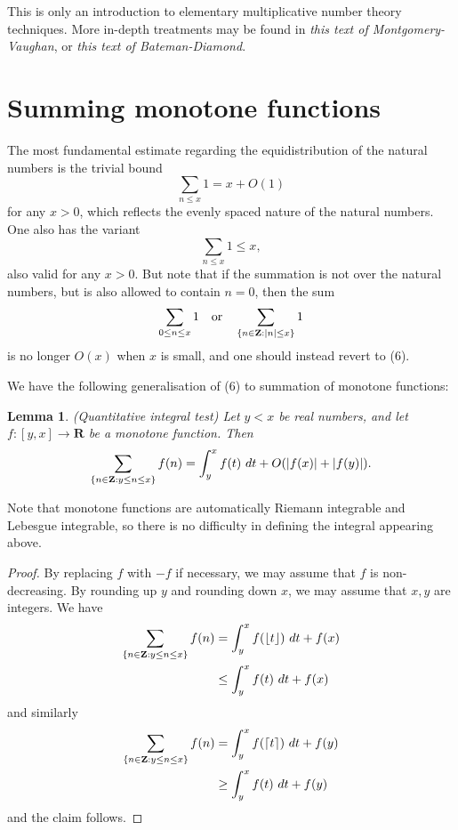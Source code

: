 \documentclass[10pt,reqno]{amsart}
\newtheorem{lemma}[theorem]{Lemma}
\begin{document}
This is only an introduction to elementary multiplicative number theory techniques. More in-depth treatments may be found in \emph{this text of Montgomery-Vaughan}, or \emph{this text of Bateman-Diamond}.

\section{Summing monotone functions}

The most fundamental estimate regarding the equidistribution of the natural numbers is the trivial bound
%
\begin{equation} \sum_{n \leq x} 1 = x + O(1) \end{equation}
%
for any $x > 0$, which reflects the evenly spaced nature of the natural numbers. One also has the variant
%
\begin{equation} \sum_{n \leq x} 1 \leq x, \end{equation}
%
also valid for any $x > 0$. But note that if the summation is not over the natural numbers, but is also allowed to contain $n=0$, then the sum
%
\[ \sum_{0 \leq n \leq x} 1 \quad \text{or} \quad \sum_{\{n \in {\bf Z}: |n| \leq x\}} 1 \]
%
is no longer $O(x)$ when $x$ is small, and one should instead revert to (6).

We have the following generalisation of (6) to summation of monotone functions:

\begin{lemma} (Quantitative integral test)
    Let $y < x$ be real numbers, and let $f: [y,x] \rightarrow \mathbf{R}$ be a monotone function. Then
    \[ \sum_{\{n \in {\bf Z}: y \leq n \leq x\}} f(n) = \int_y^x f(t)\ dt + O( |f(x)| + |f(y)| ). \]
\end{lemma}

Note that monotone functions are automatically Riemann integrable and Lebesgue integrable, so there is no difficulty in defining the integral appearing above.

\begin{proof}
    By replacing $f$ with $-f$ if necessary, we may assume that $f$ is non-decreasing. By rounding up $y$ and rounding down $x$, we may assume that $x,y$ are integers. We have
    \begin{align*}
        \sum_{\{n \in {\bf Z}: y \leq n \leq x\}} f(n) &= \int_y^x f(\lfloor t\rfloor)\ dt + f(x)\\
        &\leq \int_y^x f(t)\ dt + f(x)
    \end{align*}
    and similarly
    \begin{align*}
        \sum_{\{n \in {\bf Z}: y \leq n \leq x\}} f(n) &= \int_y^x f(\lceil t\rceil)\ dt + f(y)\\
        &\geq \int_y^x f(t)\ dt + f(y)
    \end{align*}
    and the claim follows.
\end{proof}
\end{document}
